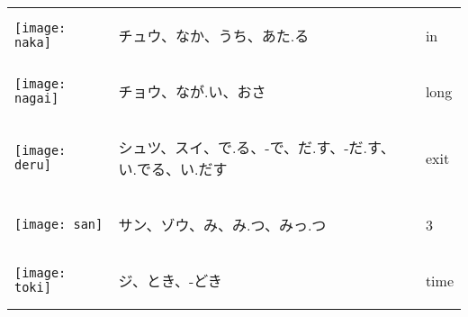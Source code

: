 \documentclass[a4paper,12pt]{extarticle}
\begin{document}
\begin{longtable}{|lp{6cm}p{4cm}|}
\\ 
\begin{minipage}{0.3\textwidth}
\centerline{
	\texttt{[image: naka]}
}
\end{minipage}
&
\begin{CJK}{UTF8}{min}チュウ、なか、うち、あた.る\end{CJK}
&
in
\\ 
\begin{minipage}{0.3\textwidth}
\centerline{
	\texttt{[image: nagai]}
}
\end{minipage}
&
\begin{CJK}{UTF8}{min}チョウ、なが.い、おさ\end{CJK}
&
long
\\ 
\begin{minipage}{0.3\textwidth}
\centerline{
	\texttt{[image: deru]}
}
\end{minipage}
&
\begin{CJK}{UTF8}{min}シュツ、スイ、で.る、-で、だ.す、-だ.す、い.でる、い.だす\end{CJK}
&
exit
\\ 
\begin{minipage}{0.3\textwidth}
\centerline{
	\texttt{[image: san]}
}
\end{minipage}
&
\begin{CJK}{UTF8}{min}サン、ゾウ、み、み.つ、みっ.つ\end{CJK}
&
3
\\ 
\begin{minipage}{0.3\textwidth}
\centerline{
	\texttt{[image: toki]}
}
\end{minipage}
&
\begin{CJK}{UTF8}{min}ジ、とき、-どき\end{CJK}
&
time

\end{longtable}
\end{document}
